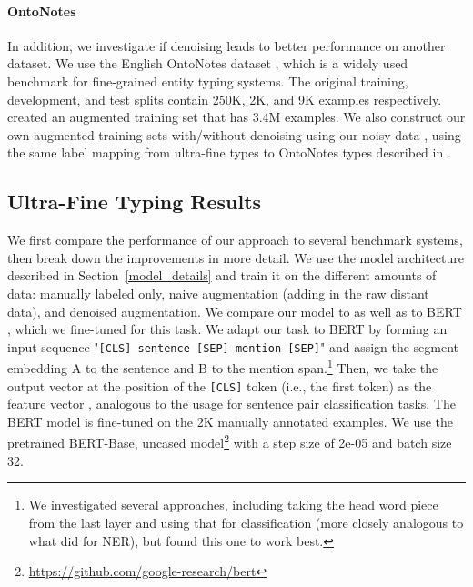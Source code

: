 \documentclass[11pt,a4paper]{article}
\begin{document}
\vspace{-4pt}
\paragraph{OntoNotes}
In addition, we investigate if denoising leads to better performance on another dataset. We use the English OntoNotes dataset \cite{Dan_Gillick_14}, which is a widely used benchmark for fine-grained entity typing systems. The original training, development, and test splits contain 250K, 2K, and 9K examples respectively. \citet{Eunsol_Choi_18} created an augmented training set that has 3.4M examples. We also construct our own augmented training sets with/without denoising using our noisy data , using the same label mapping from ultra-fine types to OntoNotes types described in \citet{Eunsol_Choi_18}. 





\subsection{Ultra-Fine Typing Results}

We first compare the performance of our approach to several benchmark systems, then break down the improvements in more detail. We use the model architecture described in Section~\ref{model_details} and train it on the different amounts of data: manually labeled only, naive augmentation (adding in the raw distant data), and denoised augmentation. We compare our model to \citet{Eunsol_Choi_18} as well as to BERT \cite{BERT18}, which we fine-tuned for this task. We adapt our task to BERT by forming an input sequence "\texttt{[CLS] sentence [SEP] mention [SEP]}" and assign the segment embedding A to the sentence and B to the mention span.\footnote{We investigated several approaches, including taking the head word piece from the last layer and using that for classification (more closely analogous to what \citet{BERT18} did for NER), but found this one to work best.} Then, we take the output vector at the position of the \texttt{[CLS]} token (i.e., the first token) as the feature vector , analogous to the usage for sentence pair classification tasks. The BERT model is fine-tuned on the 2K manually annotated examples. We use the pretrained BERT-Base, uncased model\footnote{\url{https://github.com/google-research/bert}} with a step size of 2e-05 and batch size 32.
\end{document}
